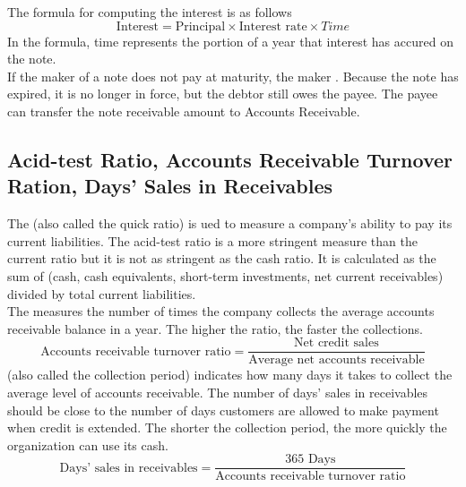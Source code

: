 \documentclass{article}
\begin{document}
The formula for computing the interest is as follows $$\textrm{Interest} = \textrm{Principal} \times \textrm{Interest rate} \times {Time}$$ In the formula, time represents the portion of a year that interest has accured on the note. \\ 

If the maker of a note does not pay at maturity, the maker . Because the note has expired, it is no longer in force, but the debtor still owes the payee. The payee can transfer the note receivable amount to Accounts Receivable. 

\subsection{Acid-test Ratio, Accounts Receivable Turnover Ration, Days' Sales in Receivables}

The  (also called the quick ratio) is ued to measure a company's ability to pay its current liabilities. The acid-test ratio is a more stringent measure than the current ratio but it is not as stringent as the cash ratio. It is calculated as the sum of (cash, cash equivalents, short-term investments, net current receivables) divided by total current liabilities. \\ 

The  measures the number of times the company collects the average accounts receivable balance in a year. The higher the ratio, the faster the collections. $$\textrm{Accounts receivable turnover ratio} = \frac{\textrm{Net credit sales}}{\textrm{Average net accounts receivable}}$$  (also called the collection period) indicates how many days it takes to collect the average level of accounts receivable. The number of days' sales in receivables should be close to the number of days customers are allowed to make payment when credit is extended. The shorter the collection period, the more quickly the organization can use its cash. $$\textrm{Days' sales in receivables} = \frac{\textrm{365 Days}}{\textrm{Accounts receivable turnover ratio}}$$
\end{document}
